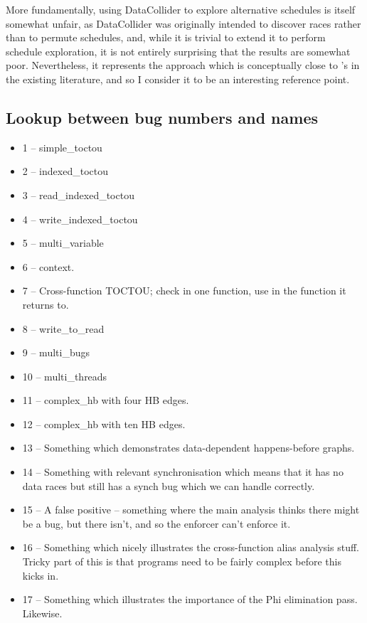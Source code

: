 More fundamentally, using DataCollider to explore alternative
schedules is itself somewhat unfair, as DataCollider was originally
intended to discover races rather than to permute schedules, and,
while it is trivial to extend it to perform schedule exploration, it
is not entirely surprising that the results are somewhat poor.
Nevertheless, it represents the approach which is conceptually close
to {\technique}'s in the existing literature, and so I consider it to
be an interesting reference point.


\subsection{Lookup between bug numbers and names}

\begin{itemize}
\item 1 -- simple\_toctou
\item 2 -- indexed\_toctou
\item 3 -- read\_indexed\_toctou
\item 4 -- write\_indexed\_toctou
\item 5 -- multi\_variable
\item 6 -- context.
\item 7 -- Cross-function TOCTOU; check in one function, use in the
  function it returns to.
\item 8 -- write\_to\_read
\item 9 -- multi\_bugs
\item 10 -- multi\_threads
\item 11 -- complex\_hb with four HB edges.
\item 12 -- complex\_hb with ten HB edges.
\item 13 -- Something which demonstrates data-dependent happens-before
  graphs.
\item 14 -- Something with relevant synchronisation which means that
  it has no data races but still has a synch bug which we can handle
  correctly.
\item 15 -- A false positive -- something where the main analysis
  thinks there might be a bug, but there isn't, and so the enforcer
  can't enforce it.
\item 16 -- Something which nicely illustrates the cross-function
  alias analysis stuff.  Tricky part of this is that programs need to
  be fairly complex before this kicks in.
\item 17 -- Something which illustrates the importance of the Phi
  elimination pass.  Likewise.
\end{itemize}

